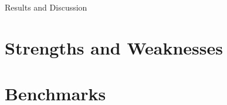 Results and Discussion

\section{Strengths and Weaknesses}
\label{sec:sw}

\section{Benchmarks}
\label{sec:benchmarks}